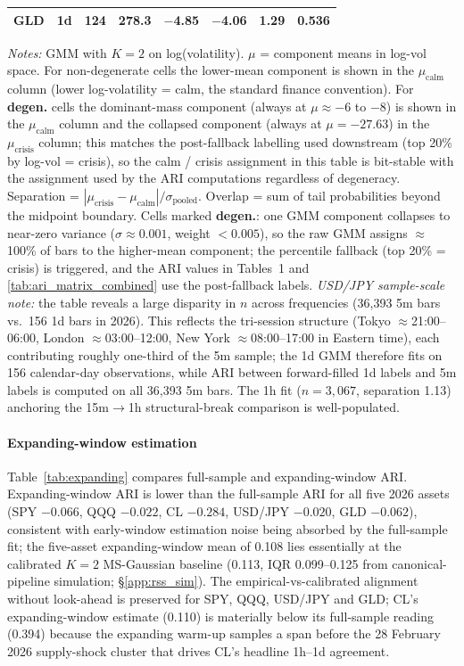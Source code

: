 \documentclass[preprint,12pt,authoryear]{elsarticle}
\begin{document}
\begin{table}[!htbp]
{\begin{tabular}{llrrrrrr}
GLD & 1d & 124 & 278.3 & $-$4.85 & $-$4.06 & 1.29 & 0.536 \\
\bottomrule
\end{tabular}%
}
\par\medskip
{\footnotesize\justifying
\textit{Notes:} GMM with $K{=}2$ on log(volatility). $\mu$ = component means in log-vol space. For non-degenerate cells the lower-mean component is shown in the $\mu_{\text{calm}}$ column (lower log-volatility = calm, the standard finance convention). For \textbf{degen.} cells the dominant-mass component (always at $\mu \approx -6$ to $-8$) is shown in the $\mu_{\text{calm}}$ column and the collapsed component (always at $\mu = -27.63$) in the $\mu_{\text{crisis}}$ column; this matches the post-fallback labelling used downstream (top 20\% by log-vol = crisis), so the calm / crisis assignment in this table is bit-stable with the assignment used by the ARI computations regardless of degeneracy. Separation = $|\mu_{\text{crisis}} - \mu_{\text{calm}}| / \sigma_{\text{pooled}}$. Overlap = sum of tail probabilities beyond the midpoint boundary. Cells marked \textbf{degen.}: one GMM component collapses to near-zero variance ($\sigma \approx 0.001$, weight $< 0.005$), so the raw GMM assigns $\approx$100\% of bars to the higher-mean component; the percentile fallback (top 20\% = crisis) is triggered, and the ARI values in Tables~1 and \ref{tab:ari_matrix_combined} use the post-fallback labels. \emph{USD/JPY sample-scale note:} the table reveals a large disparity in $n$ across frequencies (36,393 5m bars vs.\ 156 1d bars in 2026). This reflects the tri-session structure (Tokyo $\approx$21:00--06:00, London $\approx$03:00--12:00, New York $\approx$08:00--17:00 in Eastern time), each contributing roughly one-third of the 5m sample; the 1d GMM therefore fits on 156 calendar-day observations, while ARI between forward-filled 1d labels and 5m labels is computed on all 36,393 5m bars. The 1h fit ($n=3{,}067$, separation 1.13) anchoring the 15m$\to$1h structural-break comparison is well-populated.
\par}
\end{table}

\paragraph{Expanding-window estimation}
Table~\ref{tab:expanding} compares full-sample and expanding-window ARI. Expanding-window ARI is lower than the full-sample ARI for all five 2026 assets (SPY $-0.066$, QQQ $-0.022$, CL $-0.284$, USD/JPY $-0.020$, GLD $-0.062$), consistent with early-window estimation noise being absorbed by the full-sample fit; the five-asset expanding-window mean of 0.108 lies essentially at the calibrated $K{=}2$ MS-Gaussian baseline (0.113, IQR 0.099--0.125 from canonical-pipeline simulation; \S\ref{app:rss_sim}). The empirical-vs-calibrated alignment without look-ahead is preserved for SPY, QQQ, USD/JPY and GLD; CL's expanding-window estimate (0.110) is materially below its full-sample reading (0.394) because the expanding warm-up samples a span before the 28 February 2026 supply-shock cluster that drives CL's headline 1h--1d agreement.
\end{document}
